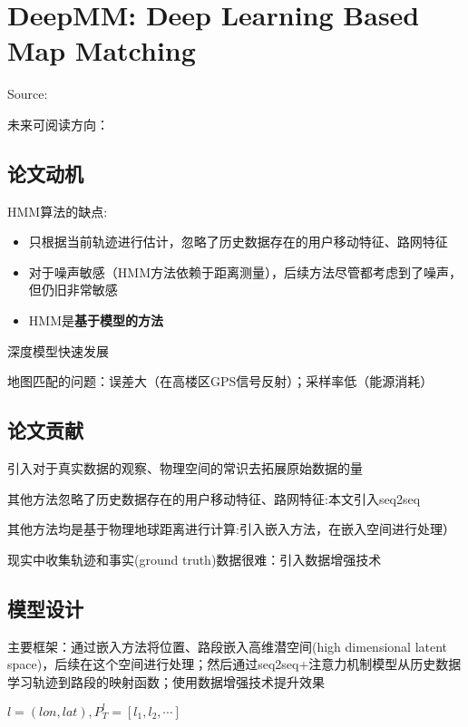 \chapter{DeepMM: Deep Learning Based Map Matching}

Source: \cite{Feng2020}

未来可阅读方向： \cite{Gong2018, Jagadeesh2014, Yang2018, Lou2009}

\section{论文动机}

HMM算法的缺点:
\label{Problem:PureHMM2}
\begin{itemize}
    \item 只根据当前轨迹进行估计，忽略了历史数据存在的用户移动特征、路网特征
    \item 对于噪声敏感（HMM方法依赖于距离测量），后续方法尽管都考虑到了噪声，但仍旧非常敏感
    \item  HMM是\textbf{基于模型的方法}
\end{itemize}

深度模型快速发展

地图匹配的问题：误差大（在高楼区GPS信号反射）；采样率低（能源消耗）

\section{论文贡献}

引入对于真实数据的观察、物理空间的常识去拓展原始数据的量

其他方法忽略了历史数据存在的用户移动特征、路网特征:本文引入seq2seq

其他方法均是基于物理地球距离进行计算:引入嵌入方法，在嵌入空间进行处理）

现实中收集轨迹和事实(ground truth)数据很难：引入数据增强技术


\section{模型设计}

主要框架：通过嵌入方法将位置、路段嵌入高维潜空间(high dimensional latent space)，后续在这个空间进行处理；然后通过seq2seq+注意力机制模型从历史数据学习轨迹到路段的映射函数；使用数据增强技术提升效果

\begin{definition}[基于GPS的轨迹]
   $ l = (lon, lat), P_T^l = [l_1, l_2, \cdots]$
\end{definition}

